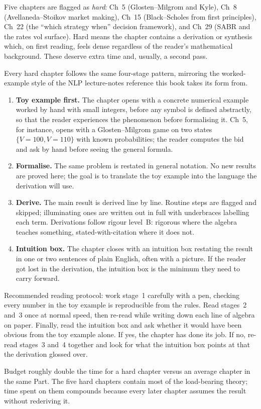 Five chapters are flagged as \emph{hard}: Ch~5 (Glosten--Milgrom and
Kyle), Ch~8 (Avellaneda--Stoikov market making), Ch~15 (Black--Scholes
from first principles), Ch~22 (the ``which strategy when'' decision
framework), and Ch~29 (SABR and the rates vol surface). Hard means the
chapter contains a derivation or synthesis which, on first reading,
feels dense regardless of the reader's mathematical background. These
deserve extra time and, usually, a second pass.

Every hard chapter follows the same four-stage pattern, mirroring the
worked-example style of the NLP lecture-notes reference this book
takes its form from.

\begin{enumerate}
\item \textbf{Toy example first.} The chapter opens with a concrete
numerical example worked by hand with small integers, before any
symbol is defined abstractly, so that the reader experiences the
phenomenon before formalising it. Ch~5, for instance, opens with a
Glosten--Milgrom game on two states $\{V=100, V=110\}$ with known
probabilities; the reader computes the bid and ask by hand before
seeing the general formula.

\item \textbf{Formalise.} The same problem is restated in general
notation. No new results are proved here; the goal is to translate
the toy example into the language the derivation will use.

\item \textbf{Derive.} The main result is derived line by line.
Routine steps are flagged and skipped; illuminating ones are written
out in full with underbraces labelling each term. Derivations follow
rigour level~B: rigorous where the algebra teaches something,
stated-with-citation where it does not.

\item \textbf{Intuition box.} The chapter closes with an intuition box
restating the result in one or two sentences of plain English, often
with a picture. If the reader got lost in the derivation, the intuition
box is the minimum they need to carry forward.
\end{enumerate}

Recommended reading protocol: work stage~1 carefully with a pen,
checking every number in the toy example is reproducible from the
rules. Read stages~2 and~3 once at normal speed, then re-read while
writing down each line of algebra on paper. Finally, read the intuition
box and ask whether it would have been obvious from the toy example
alone. If yes, the chapter has done its job. If no, re-read
stages~3 and~4 together and look for what the intuition box points at
that the derivation glossed over.

Budget roughly double the time for a hard chapter versus an average
chapter in the same Part. The five hard chapters contain most of the
load-bearing theory; time spent on them compounds because every later
chapter assumes the result without rederiving it.
